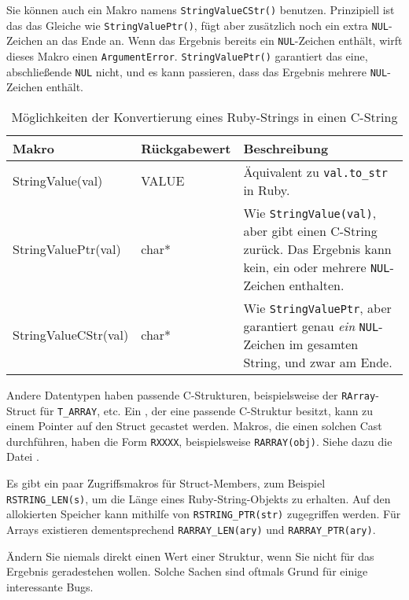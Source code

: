 Sie können auch ein Makro namens \verb+StringValueCStr()+
benutzen. Prinzipiell ist das das Gleiche wie \verb+StringValuePtr()+,
fügt aber zusätzlich noch ein extra \verb+NUL+-Zeichen an das Ende
an. Wenn das Ergebnis  bereits ein \verb+NUL+-Zeichen enthält, wirft
dieses Makro einen \verb+ArgumentError+. \verb+StringValuePtr()+
garantiert das eine, abschließende \verb+NUL+ nicht, und es kann
passieren, dass das Ergebnis mehrere \verb+NUL+-Zeichen enthält.

\begin{table}[btp]
  \centering
  \begin{tabularx}{\linewidth}{>{\ttfamily}l>{\ttfamily}lX}
    \textbf{\rmfamily Makro} & \textbf{\rmfamily Rückgabewert} & \textbf{Beschreibung}\\
    \hline

    StringValue(val) & VALUE & Äquivalent zu \lstinline+val.to_str+ in
    Ruby.\\

    StringValuePtr(val) & char* & Wie \verb+StringValue(val)+, aber
    gibt einen C-String zurück. Das Ergebnis kann kein, ein oder
    mehrere \verb+NUL+-Zeichen enthalten.\\

    StringValueCStr(val) & char* & Wie \verb+StringValuePtr+, aber
    garantiert genau \emph{ein} \verb+NUL+-Zeichen im gesamten String,
    und zwar am Ende.
  \end{tabularx}
  \caption{Möglichkeiten der Konvertierung eines Ruby-Strings in einen C-String}
  \label{tab:stringkonv}
\end{table}

Andere Datentypen haben passende C-Strukturen, beispielsweise der
\verb+RArray+-Struct für \verb+T_ARRAY+, etc. Ein \VALUE, der eine
passende C-Struktur besitzt, kann zu einem Pointer auf den Struct
gecastet werden. Makros, die einen solchen Cast durchführen, haben die
Form \verb+RXXXX+, beispielsweise \verb+RARRAY(obj)+. Siehe dazu die
Datei .

Es gibt ein paar Zugriffsmakros für Struct-Members, zum Beispiel
\verb+RSTRING_LEN(s)+, um die Länge eines Ruby-String-Objekts zu
erhalten. Auf den allokierten Speicher kann mithilfe von
\verb+RSTRING_PTR(str)+ zugegriffen werden. Für Arrays existieren
dementsprechend \verb+RARRAY_LEN(ary)+ und \verb+RARRAY_PTR(ary)+.

\begin{notice}
  Ändern Sie niemals direkt einen Wert einer Struktur, wenn Sie nicht
  für das Ergebnis geradestehen wollen. Solche Sachen sind oftmals
  Grund für einige interessante Bugs.
\end{notice}

